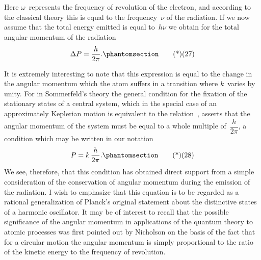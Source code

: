 Here $\omega$~represents the frequency of revolution of the electron,
and according to the classical theory this is equal to the frequency~$\nu$
of the radiation. If we now assume that the total energy emitted
is equal to~$h\nu$ we obtain for the total angular momentum of the
radiation
\[
\Delta P = \frac{h}{2\pi}.
\Tag{(27)}
\]

It is extremely interesting to note that this expression is equal
to the change in the angular momentum which the atom suffers in
a transition where $k$~varies by unity. For in Sommerfeld's theory
the general condition for the fixation of the stationary states of a
central system, which in the special case of an approximately
Keplerian motion is equivalent to the relation~, asserts that
the angular momentum of the system must be equal to a whole
multiple of~$\dfrac{h}{2\pi}$, a condition which may be written in our notation
\[
P = k\, \frac{h}{2\pi}.
\Tag{(28)}
\]
We see, therefore, that this condition has obtained direct support
from a simple consideration of the conservation of angular momentum
during the emission of the radiation. I wish to emphasize
that this equation is to be regarded as a rational generalization of
Planck's original statement about the distinctive states of a harmonic
oscillator. It may be of interest to recall that the possible
significance of the angular momentum in applications of the
quantum theory to atomic processes was first pointed out by
Nicholson on the basis of the fact that for a circular motion the
angular momentum is simply proportional to the ratio of the
kinetic energy to the frequency of revolution.

